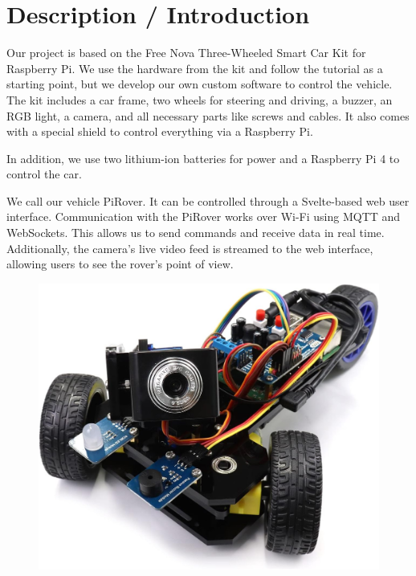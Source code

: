 \section{Description / Introduction}

Our project is based on the Free Nova Three-Wheeled Smart Car Kit for Raspberry Pi. We use the hardware from the kit and follow the tutorial as a starting point, but we develop our own custom software to control the vehicle.
The kit includes a car frame, two wheels for steering and driving, a buzzer, an RGB light, a camera, and all necessary parts like screws and cables. It also comes with a special shield to control everything via a Raspberry Pi.

In addition, we use two lithium-ion batteries for power and a Raspberry Pi 4 to control the car.

We call our vehicle PiRover. It can be controlled through a Svelte-based web user interface. Communication with the PiRover works over Wi-Fi using MQTT and WebSockets. This allows us to send commands and receive data in real time.
Additionally, the camera’s live video feed is streamed to the web interface, allowing users to see the rover’s point of view.


\begin{figure}[h!]
    \includegraphics[width=15cm]{assets/img/FreeNova_ThreeWheeledSmartCar_ImagePicture}
\end{figure}
